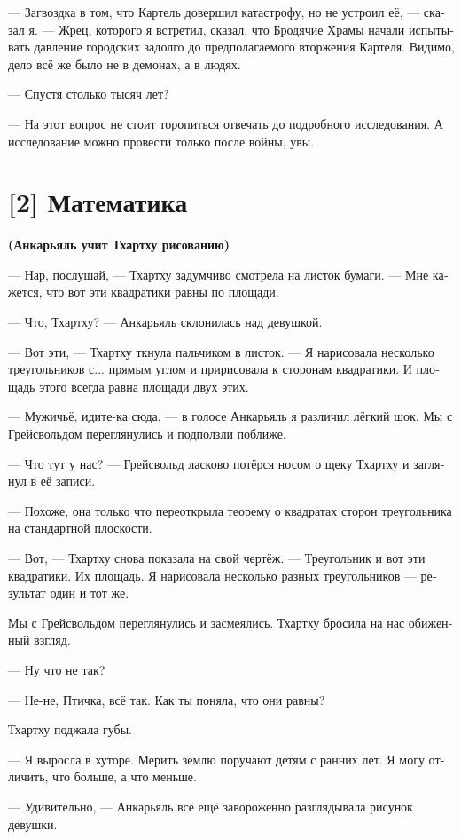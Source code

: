 \documentclass[a4paper,12pt,fleqn]{book}\usepackage{polyglossia}\setdefaultlanguage[babelshorthands=true]{russian}\setotherlanguage{english}\defaultfontfeatures{Ligatures=TeX,Mapping=tex-text}\usepackage{xcolor}\newcommand{\ml}[3]{#2}
\begin{document}
{--- Загвоздка в том, что Картель довершил катастрофу, но не устроил её, --- сказал я.
--- Жрец, которого я встретил, сказал, что Бродячие Храмы начали испытывать давление городских задолго до предполагаемого вторжения Картеля.
Видимо, дело всё же было не в демонах, а в людях.

--- Спустя столько тысяч лет?

--- На этот вопрос не стоит торопиться отвечать до подробного исследования.
А исследование можно провести только после войны, увы.

\section{[2] Математика}

\textbf{(Анкарьяль учит Тхартху рисованию)}

--- Нар, послушай, --- Тхартху задумчиво смотрела на листок бумаги.
--- Мне кажется, что вот эти квадратики равны по площади.

--- Что, Тхартху? --- Анкарьяль склонилась над девушкой.

--- Вот эти, --- Тхартху ткнула пальчиком в листок.
--- Я нарисовала несколько треугольников с... прямым углом и пририсовала к сторонам квадратики.
И площадь этого всегда равна площади двух этих.

--- Мужичьё, идите-ка сюда, --- в голосе Анкарьяль я различил лёгкий шок.
Мы с Грейсвольдом переглянулись и подползли поближе.

--- Что тут у нас? --- Грейсвольд ласково потёрся носом о щеку Тхартху и заглянул в её записи.

--- Похоже, она только что переоткрыла теорему о квадратах сторон треугольника на стандартной плоскости.

--- Вот, --- Тхартху снова показала на свой чертёж.
--- Треугольник и вот эти квадратики.
Их площадь.
Я нарисовала несколько разных треугольников --- результат один и тот же.

Мы с Грейсвольдом переглянулись и засмеялись.
Тхартху бросила на нас обиженный взгляд.

--- Ну что не так?

--- Не-не, Птичка, всё так.
Как ты поняла, что они равны?

Тхартху поджала губы.

--- Я выросла в хуторе.
Мерить землю поручают детям с ранних лет.
Я могу отличить, что больше, а что меньше.

--- Удивительно, --- Анкарьяль всё ещё завороженно разглядывала рисунок девушки.

}
\end{document}
